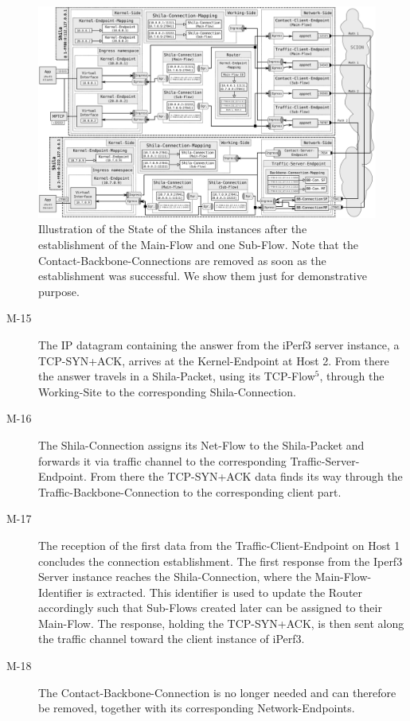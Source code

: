 	\begin{landscape}
		\begin{figure}
			\begin{center}
				\def\svgwidth{1\textwidth}
				\includegraphics[scale=0.2]{../illustrations/implementation/ConnectionEstablishment.pdf}   
				\caption[]{Illustration of the State of the Shila instances after the establishment of the Main-Flow and one Sub-Flow. Note that the Contact-Backbone-Connections are removed as soon as the establishment was successful. We show them just for demonstrative purpose.}
				\label{fig:ConnectionEstablishment}
			\end{center}
		\end{figure}
	\end{landscape}
\begin{description}		
	\item[M-15] The IP datagram containing the answer from the iPerf3 server instance, a TCP-SYN+ACK, arrives at the Kernel-Endpoint at Host 2. From there the answer travels in a Shila-Packet, using its TCP-Flow$^{5}$, through the Working-Site to the corresponding Shila-Connection.
	\item[M-16] The Shila-Connection assigns its Net-Flow to the Shila-Packet and forwards it via traffic channel to the corresponding Traffic-Server-Endpoint. From there the TCP-SYN+ACK data finds its way through the Traffic-Backbone-Connection to the corresponding client part. 
	\item[M-17] The reception of the first data from the Traffic-Client-Endpoint on Host 1 concludes the connection establishment. The first response from the Iperf3 Server instance reaches the Shila-Connection, where the Main-Flow-Identifier is extracted. This identifier is used to update the Router accordingly such that Sub-Flows created later can be assigned to their Main-Flow. The response, holding the TCP-SYN+ACK, is then sent along the traffic channel toward the client instance of iPerf3.
	\item[M-18] The Contact-Backbone-Connection is no longer needed and can therefore be removed, together with its corresponding Network-Endpoints.
\end{description}

